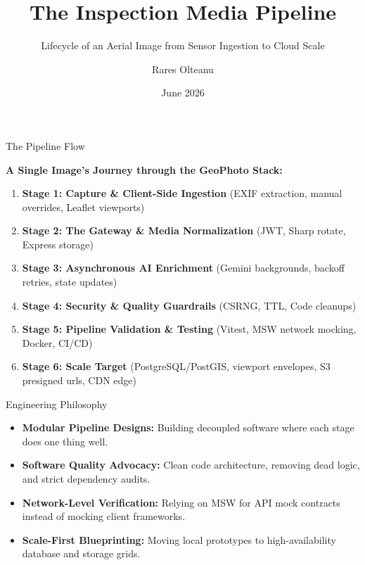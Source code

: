 \documentclass[aspectratio=169]{beamer}
\title[The Inspection Media Pipeline]{The Inspection Media Pipeline}
\subtitle{Lifecycle of an Aerial Image from Sensor Ingestion to Cloud Scale}
\author{Rares Olteanu}
\date{June 2026}
\begin{document}
\begin{frame}
  \titlepage
\end{frame}

\begin{frame}{The Pipeline Flow}
  \begin{center}
    \textbf{A Single Image's Journey through the GeoPhoto Stack:}
  \end{center}
  \begin{enumerate}
    \item \textbf{Stage 1: Capture \& Client-Side Ingestion} (EXIF extraction, manual overrides, Leaflet viewports)
    \item \textbf{Stage 2: The Gateway \& Media Normalization} (JWT, Sharp rotate, Express storage)
    \item \textbf{Stage 3: Asynchronous AI Enrichment} (Gemini backgrounds, backoff retries, state updates)
    \item \textbf{Stage 4: Security \& Quality Guardrails} (CSRNG, TTL, Code cleanups)
    \item \textbf{Stage 5: Pipeline Validation \& Testing} (Vitest, MSW network mocking, Docker, CI/CD)
    \item \textbf{Stage 6: Scale Target} (PostgreSQL/PostGIS, viewport envelopes, S3 presigned urls, CDN edge)
  \end{enumerate}
\end{frame}

\begin{frame}{Engineering Philosophy}
  \begin{itemize}
    \item \textbf{Modular Pipeline Designs:} Building decoupled software where each stage does one thing well.
    \item \textbf{Software Quality Advocacy:} Clean code architecture, removing dead logic, and strict dependency audits.
    \item \textbf{Network-Level Verification:} Relying on MSW for API mock contracts instead of mocking client frameworks.
    \item \textbf{Scale-First Blueprinting:} Moving local prototypes to high-availability database and storage grids.
  \end{itemize}
\end{frame}
\end{document}
